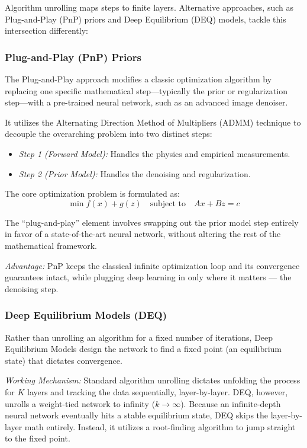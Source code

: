 \documentclass[conference]{IEEEtran}
\begin{document}
Algorithm unrolling maps steps to finite layers. Alternative approaches, such as Plug-and-Play (PnP) priors and Deep Equilibrium (DEQ) models, tackle this intersection differently:

\subsubsection{Plug-and-Play (PnP) Priors \texorpdfstring{\cite{venkatakrishnan2013plug}}{}}

The Plug-and-Play approach modifies a classic optimization algorithm by replacing one specific mathematical step—typically the prior or regularization step—with a pre-trained neural network, such as an advanced image denoiser. 

It utilizes the Alternating Direction Method of Multipliers (ADMM) technique to decouple the overarching problem into two distinct steps:
\begin{itemize}
    \item \textit{Step 1 (Forward Model):} Handles the physics and empirical measurements.
    \item \textit{Step 2 (Prior Model):} Handles the denoising and regularization.
\end{itemize}

The core optimization problem is formulated as:
\begin{equation}
\min f(x) + g(z) \quad \text{subject to} \quad Ax + Bz = c
\end{equation}

The ``plug-and-play'' element involves swapping out the prior model step entirely in favor of a state-of-the-art neural network, without altering the rest of the mathematical framework. 

\textit{Advantage:} PnP keeps the classical infinite optimization loop and its convergence guarantees intact, while plugging deep learning in only where it matters — the denoising step.

\subsubsection{Deep Equilibrium Models (DEQ) \texorpdfstring{\cite{bai2019deep}}{}}

Rather than unrolling an algorithm for a fixed number of iterations, Deep Equilibrium Models design the network to find a fixed point (an equilibrium state) that dictates convergence.

\textit{Working Mechanism:} Standard algorithm unrolling dictates unfolding the process for $K$ layers and tracking the data sequentially, layer-by-layer. DEQ, however, unrolls a weight-tied network to infinity ($k \to \infty$). Because an infinite-depth neural network eventually hits a stable equilibrium state, DEQ skips the layer-by-layer math entirely. Instead, it utilizes a root-finding algorithm to jump straight to the fixed point.
\end{document}
